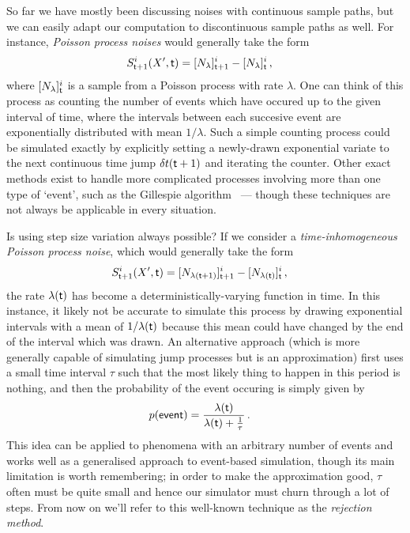 \documentclass{book}
\begin{document}
So far we have mostly been discussing noises with continuous sample paths, but we can easily adapt our computation to discontinuous sample paths as well. For instance, \emph{Poisson process noises} would generally take the form
\begin{align}
S^{i}_{{\sf t}+1}(X',{\sf t}) &= [N_{\lambda}]^i_{{\sf t}+1}-[N_{\lambda}]^i_{\sf t}\,,
\end{align}
where $[N_{\lambda}]^i_{\sf t}$ is a sample from a Poisson process with rate $\lambda$. One can think of this process as counting the number of events which have occured up to the given interval of time, where the intervals between each succesive event are exponentially distributed with mean $1/\lambda$. Such a simple counting process could be simulated exactly by explicitly setting a newly-drawn exponential variate to the next continuous time jump ${\delta t}({\sf t}+1)$ and iterating the counter. Other exact methods exist to handle more complicated processes involving more than one type of `event', such as the Gillespie algorithm~\cite{gillespie1977exact} --- though these techniques are not always be applicable in every situation.

Is using step size variation always possible? If we consider a \emph{time-inhomogeneous Poisson process noise}, which would generally take the form
\begin{align}
S^{i}_{{\sf t}+1}(X',{\sf t}) &= [N_{\lambda ({\sf t}+1)}]^i_{{\sf t}+1}-[N_{\lambda ({\sf t})}]^i_{\sf t}\,,
\end{align}
the rate $\lambda ({\sf t})$ has become a deterministically-varying function in time. In this instance, it likely not be accurate to simulate this process by drawing exponential intervals with a mean of $1/\lambda ({\sf t})$ because this mean could have changed by the end of the interval which was drawn. An alternative approach (which is more generally capable of simulating jump processes but is an approximation) first uses a small time interval $\tau$ such that the most likely thing to happen in this period is nothing, and then the probability of the event occuring is simply given by
\begin{align}
p({\sf event}) &= \frac{\lambda ({\sf t})}{\lambda ({\sf t}) + \frac{1}{\tau}} \label{eq:rejection}\,.
\end{align}
This idea can be applied to phenomena with an arbitrary number of events and works well as a generalised approach to event-based simulation, though its main limitation is worth remembering; in order to make the approximation good, $\tau$ often must be quite small and hence our simulator must churn through a lot of steps. From now on we'll refer to this well-known technique as the \emph{rejection method}.
\end{document}
